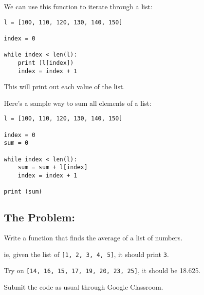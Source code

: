 \documentclass[11pt]{article}
\begin{document}
We can use this function to iterate through a list:

\begin{verbatim}
l = [100, 110, 120, 130, 140, 150]

index = 0

while index < len(l):
    print (l[index])
    index = index + 1
\end{verbatim}

This will print out each value of the list.

Here's a sample way to sum all elements of a list:

\begin{verbatim}
l = [100, 110, 120, 130, 140, 150]

index = 0
sum = 0

while index < len(l):
    sum = sum + l[index]
    index = index + 1

print (sum)
\end{verbatim}

\subsection{The Problem:}
\label{sec:org5eeb166}
Write a function that finds the average of a list of numbers.

ie, given the list of \texttt{[1, 2, 3, 4, 5]}, it should print \texttt{3}.

Try on \texttt{[14, 16, 15, 17, 19, 20, 23, 25]}, it should be 18.625.

Submit the code as usual through Google Classroom.
\end{document}

